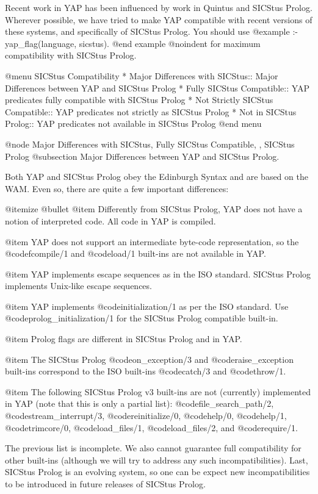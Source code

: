 Recent work in YAP has been influenced by work in Quintus and
SICStus Prolog. Wherever possible, we have tried to make YAP
compatible with recent versions of these systems, and specifically of
SICStus Prolog. You should use 
@example
:- yap_flag(language, sicstus).
@end example
@noindent
for maximum compatibility with SICStus Prolog.

@menu
SICStus Compatibility
* Major Differences with SICStus:: Major Differences between YAP and SICStus Prolog
* Fully SICStus Compatible:: YAP predicates fully compatible with
SICStus Prolog
* Not Strictly SICStus Compatible:: YAP predicates not strictly as
SICStus Prolog
* Not in SICStus Prolog:: YAP predicates not available in SICStus Prolog
@end menu

@node Major Differences with SICStus, Fully SICStus Compatible, , SICStus Prolog
@subsection Major Differences between YAP and SICStus Prolog.

Both YAP and SICStus Prolog obey the Edinburgh Syntax and are based on
the WAM. Even so, there are quite a few important differences:

@itemize @bullet
@item Differently from SICStus Prolog, YAP does not have a
notion of interpreted code. All code in YAP is compiled.

@item YAP does not support an intermediate byte-code
representation, so the @code{fcompile/1} and @code{load/1} built-ins are
not available in YAP.

@item YAP implements escape sequences as in the ISO standard. SICStus
Prolog implements Unix-like escape sequences.

@item YAP implements @code{initialization/1} as per the ISO
standard. Use @code{prolog_initialization/1} for the SICStus Prolog
compatible built-in.

@item Prolog flags are different in SICStus Prolog and in YAP.

@item The SICStus Prolog @code{on_exception/3} and
@code{raise_exception} built-ins correspond to the ISO built-ins
@code{catch/3} and @code{throw/1}.

@item The following SICStus Prolog v3 built-ins are not (currently)
implemented in YAP (note that this is only a partial list):
@code{file_search_path/2},
@code{stream_interrupt/3}, @code{reinitialize/0}, @code{help/0},
@code{help/1}, @code{trimcore/0}, @code{load_files/1},
@code{load_files/2}, and @code{require/1}.

      The previous list is incomplete. We also cannot guarantee full
compatibility for other built-ins (although we will try to address any
such incompatibilities). Last, SICStus Prolog is an evolving system, so
one can be expect new incompatibilities to be introduced in future
releases of SICStus Prolog.

